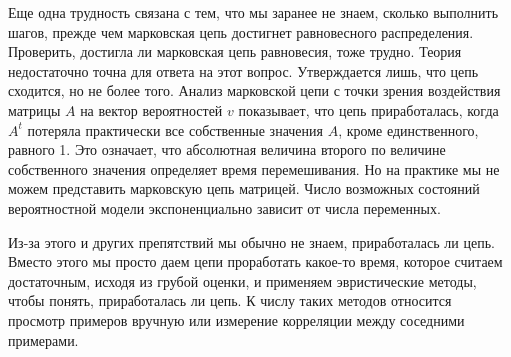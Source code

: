 \documentclass[%
	11pt,
	a4paper,
	utf8,
]{article}
\begin{document}
Еще одна трудность связана с тем, что мы заранее не знаем, сколько выполнить шагов, прежде чем марковская цепь достигнет равновесного распределения. Проверить, достигла ли марковская цепь равновесия, тоже трудно. Теория недостаточно точна для ответа на этот вопрос. Утверждается лишь, что цепь сходится, но не более того. Анализ марковской цепи с точки зрения воздействия матрицы $ A $ на вектор вероятностей $ v $ показывает, что цепь приработалась, когда $ A^t $ потеряла практически все собственные значения $ A $, кроме единственного, равного 1. Это означает, что абсолютная величина второго по величине собственного значения определяет время перемешивания. Но на практике мы не можем представить марковскую цепь матрицей. Число возможных состояний вероятностной модели экспоненциально зависит от числа переменных. 

Из-за этого и других препятствий мы обычно не знаем, приработалась ли цепь. Вместо этого мы просто даем цепи проработать какое-то время, которое считаем достаточным, исходя из грубой оценки, и применяем эвристические методы, чтобы понять, приработалась ли цепь. К числу таких методов относится просмотр примеров вручную или измерение корреляции между соседними примерами.










\begin{thebibliography}{99}
	
	
\end{thebibliography}


\end{document}
